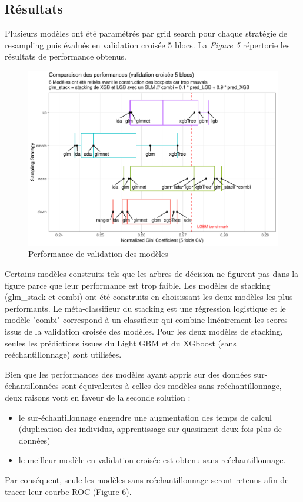 \documentclass[french]{article}
\begin{document}
\begin{multicols}{2}
\section{Résultats}

Plusieurs modèles ont été paramétrés par \og grid search \fg{} pour chaque stratégie de resampling puis évalués en validation croisée 5 blocs. La \emph{Figure 5} répertorie les résultats de performance obtenus.

\begin{figure}[H] \centering
  \includegraphics[width = \columnwidth]{img/results}
  \caption{Performance de validation des modèles}
\end{figure}

Certains modèles construits tels que les arbres de décision ne figurent pas dans la figure parce que leur performance est trop faible. Les modèles de stacking (glm\_stack et combi) ont été construits en choisissant les deux modèles les plus performants. Le méta-classifieur du stacking est une régression logistique et le modèle "combi" correspond à un classifieur qui combine linéairement les scores issus de la validation croisée des modèles. Pour les deux modèles de stacking, seules les prédictions issues du Light GBM et du XGboost (sans reéchantillonnage) sont utilisées.

Bien que les performances des modèles ayant appris sur des données sur-échantillonnées sont équivalentes à celles des modèles sans reéchantillonnage, deux raisons vont en faveur de la seconde solution :
\begin{itemize}
    \item le sur-échantillonnage engendre une augmentation des temps de calcul (duplication des individus, apprentissage sur quasiment deux fois plus de données)
    \item le meilleur modèle en validation croisée est obtenu sans reéchantillonnage.
\end{itemize}
Par conséquent, seule les modèles sans reéchantillonnage seront retenus afin de tracer leur courbe ROC (Figure 6).


\end{multicols}
\end{document}
